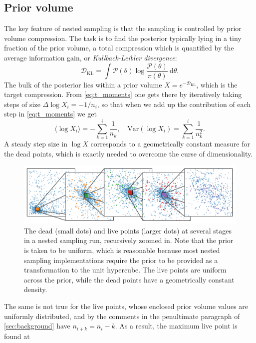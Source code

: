 \documentclass[usenatbib]{mnras}
\newcommand{\DKL}{\mathcal{D}_\mathrm{KL}}
\begin{document}
\subsection{Prior volume}\label{sec:prior_volume}
The key feature of nested sampling is that the sampling is controlled by prior volume compression. The task is to find the posterior typically lying in a tiny fraction of the prior volume, a total compression which is quantified by the average information gain, or \textit{Kullback-Leibler divergence}:
\begin{equation}\label{eq:DKL}
   \DKL = \int \mathcal{P}(\theta) \log \frac{\mathcal{P}(\theta)}{\pi(\theta)}\ \mathrm{d}\theta. 
\end{equation}
The bulk of the posterior lies within a prior volume ${X = e^{-\DKL}}$, which is the target compression. From \cref{eq:t_moments} one gets there by iteratively taking steps of size ${\Delta \log X_i = -1/n_i}$, so that when we add up the contribution of each step in \cref{eq:t_moments} we get
\begin{equation}
    \langle\log X_i\rangle = -\sum_{k=1}^i \frac{1}{n_k}, \quad \mathrm{Var}(\log X_i) = \sum_{k=1}^i \frac{1}{n_k^2}.
\end{equation}
A steady step size in $\log X$ corresponds to a geometrically constant measure for the dead points, which is exactly needed to overcome the curse of dimensionality.
\begin{figure}
\begin{center}
    \includegraphics{figures/dead_measure_live.pdf}
\end{center}
\caption{The dead (small dots) and live points (larger dots) at several stages in a nested sampling run, recursively zoomed in. Note that the prior is taken to be uniform, which is reasonable because most nested sampling implementations require the prior to be provided as a transformation to the unit hypercube. The live points are uniform across the prior, while the dead points have a geometrically constant density.}
\label{fig:dead_measure}
\end{figure}
\par
The same is not true for the live points, whose enclosed prior volume values are uniformly distributed, and by the comments in the penultimate paragraph of \cref{sec:background} have ${n_{i+k} = n_i-k}$. As a result, the maximum live point is found at 
\end{document}

